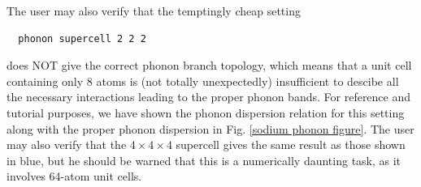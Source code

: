 The user may also verify that the temptingly cheap setting 
\begin{verbatim}
  phonon supercell 2 2 2 
\end{verbatim}
does NOT give the correct phonon branch topology, which means that a
unit cell containing only 8 atoms is (not totally unexpectedly)
insufficient to descibe all the necessary interactions leading to the
proper phonon bands. For reference and tutorial purposes, we have
shown the phonon dispersion relation for this setting along with the
proper phonon dispersion in Fig. \ref{sodium phonon figure}. The user
may also verify that the $4\times4\times4$ supercell gives the same
result as those shown in blue, but he should be warned that this is a
numerically daunting task, as it involves 64-atom unit
cells. 



